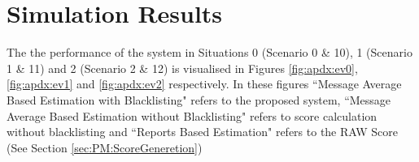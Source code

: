 \documentclass[journal]{IEEEtran}
\begin{document}
\section{Simulation Results}
\label{apdx:simResults}

The the performance of the system in Situations 0 (Scenario 0 \& 10), 1 (Scenario 1 \& 11) and 2 (Scenario 2 \& 12) is visualised in Figures  \ref{fig:apdx:ev0}, \ref{fig:apdx:ev1} and \ref{fig:apdx:ev2} respectively.
In these figures ``Message Average Based Estimation with Blacklisting" refers to the proposed system, ``Message Average Based Estimation without Blacklisting" refers to score calculation without blacklisting and ``Reports Based Estimation" refers to the RAW Score (See Section \ref{sec:PM:ScoreGeneretion})
\begin{figure}[!ht]
	\centering
\end{figure}
\end{document}
